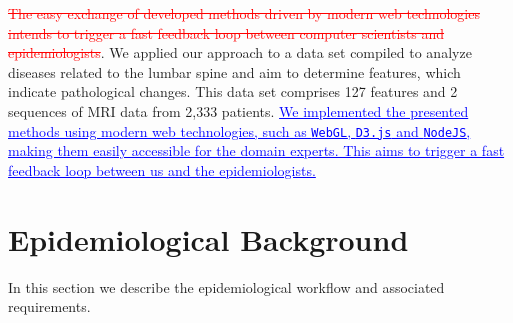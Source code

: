 \documentclass[journal]{style/vgtc} 			          %
\newcommand{\rem}[1]{\textcolor{red}{\sout{#1}}}
\newcommand{\add}[1]{\textcolor{blue}{\uline{#1}}}
\begin{document}
%
\rem{The easy exchange of developed methods driven by modern web technologies intends to trigger a fast feedback loop between computer scientists and epidemiologists}.
We applied our approach to a data set compiled to analyze diseases related to the lumbar spine and aim to determine features, which indicate pathological changes.
%
This data set comprises 127 features and 2 sequences of MRI data from 2,333 patients.
%
\add{We implemented the presented methods using modern web technologies, such as \texttt{WebGL}, \texttt{D3.js} and \texttt{NodeJS}, making them easily accessible for the domain experts.
%
This aims to trigger a fast feedback loop between us and the epidemiologists.}

\section{Epidemiological Background} \label{MedicalAndTechnicalBackground}

In this section we describe the epidemiological workflow and associated requirements.
\end{document}
